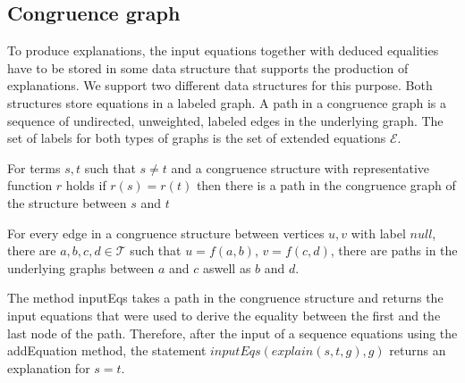\subsection*{Congruence graph}

To produce explanations, the input equations together with deduced equalities have to be stored in some data structure that supports the production of explanations.
We support two different data structures for this purpose.
Both structures store equations in a labeled graph.
A path in a congruence graph is a sequence of undirected, unweighted, labeled edges in the underlying graph.
The set of labels for both types of graphs is the set of extended equations $\mathcal{E}$.

\begin{invariant}[Paths]

For terms $s, t$ such that $s \neq t$ and a congruence structure with representative function $r$ holds if $r(s) = r(t)$ then there is a path in the congruence graph of the structure between $s$ and $t$

\end{invariant}

\begin{invariant}[Insert]

For every edge in a congruence structure between vertices $u,v$ with label $null$, 
there are $a,b,c,d \in \mathcal{T}$ such that $u = f(a,b)$, $v = f(c,d)$, 
there are paths in the underlying graphs between $a$ and $c$ aswell as $b$ and $d$.

\end{invariant}


The method inputEqs takes a path in the congruence structure and returns the input equations that were used to derive the equality between the first and the last node of the path.
Therefore, after the input of a sequence equations using the addEquation method, the statement $inputEqs(explain(s,t,g),g)$ returns an explanation for $s = t$.





